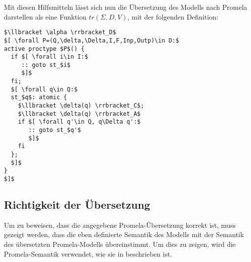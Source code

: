 Mit diesen Hilfsmitteln lässt sich nun die Übersetzung des Modells nach Promela darstellen als eine Funktion $tr(\Sigma,D,V)$, mit der folgenden Definition:
\begin{lstlisting}[language=Promela,mathescape=true]
$\llbracket \alpha \rrbracket_D$
$[ \forall P=(Q,\delta,\Delta,I,F,Inp,Outp)\in D:$
active proctype $P$() {
  if $[ \forall i\in I:$
     :: goto st_$i$
     $]$
  fi;
  $[ \forall q\in Q:$
  st_$q$: atomic {
    $\llbracket \delta(q) \rrbracket_C$;
    $\llbracket \delta(q) \rrbracket_A$
    if $[ \forall q'\in Q, q\Delta q':$
       :: goto st_$q'$
       $]$
    fi
  };
  $]$
}
$]$
\end{lstlisting}
\subsection{Richtigkeit der Übersetzung}
Um zu beweisen, dass die angegebene Promela-Übersetzung korrekt ist, muss gezeigt werden, dass die eben definierte Semantik des Modells mit der Semantik des übersetzten Promela-Modells übereinstimmt.
Um dies zu zeigen, wird die Promela-Semantik verwendet, wie sie in \cite{Weise97anincremental} beschrieben ist.